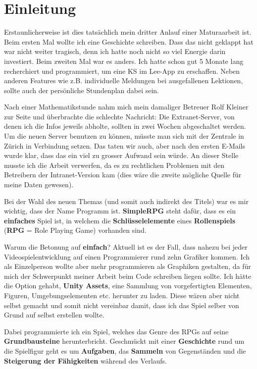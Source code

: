 \chapter{Einleitung}

Erstaunlicherweise ist dies tatsächlich mein dritter Anlauf einer Maturaarbeit ist.
Beim ersten Mal wollte ich eine Geschichte schreiben.
Dass das nicht geklappt hat war nicht weiter tragisch, denn ich hatte noch nicht so viel Energie darin investiert.
Beim zweiten Mal war es anders.
Ich hatte schon gut 5 Monate lang recherchiert und programmiert, um eine KS im Lee-App zu erschaffen.
Neben anderen Features wie z.B. individuelle Meldungen bei ausgefallenen Lektionen, sollte auch der persönliche Stundenplan dabei sein. 

\smallskip
Nach einer Mathematikstunde nahm mich mein damaliger Betreuer Rolf Kleiner zur Seite und überbrachte die schlechte Nachricht: Die Extranet-Server, von denen ich die Infos jeweils abholte, sollten in zwei Wochen abgeschaltet werden. Um die neuen Server benutzen zu können, müsste man sich mit der Zentrale in Zürich in Verbindung setzen. Das taten wir auch, aber nach den ersten E-Mails wurde klar, dass das ein viel zu grosser Aufwand sein würde. An dieser Stelle musste ich die Arbeit verwerfen, da es zu rechtlichen Problemen mit den Betreibern der Intranet-Version kam (dies wäre die zweite mögliche Quelle für meine Daten gewesen).

\smallskip
Bei der Wahl des neuen Themas (und somit auch indirekt des Titels) war es mir wichtig, dass der Name Programm ist.
\textbf{SimpleRPG} steht dafür, dass es ein \textbf{einfaches} Spiel ist, in welchem die \textbf{Schlüsselelemente} eines \textbf{Rollenspiels} (\textbf{RPG} = Role Playing Game) vorhanden sind.

\smallskip
Warum die Betonung auf \textbf{einfach}? Aktuell ist es der Fall, dass nahezu bei jeder Videospielentwicklung auf einen Programmierer rund zehn Grafiker kommen.
Ich als Einzelperson wollte aber mehr programmieren als Graphiken gestalten, da für mich der Schwerpunkt meiner Arbeit beim Code schreiben liegen sollte.
Ich hätte die Option gehabt, \textbf{Unity Assets}, eine Sammlung von vorgefertigten Elementen, Figuren, Umgebungselementen etc. herunter zu laden.
Diese wären aber nicht selbst gemacht und somit nicht vereinbar damit, dass ich das Spiel selber von Grund auf selbst erstellen wollte.

\smallskip
Dabei programmierte ich ein Spiel, welches das Genre des RPGs auf seine \textbf{Grundbausteine} herunterbricht. Geschmückt mit einer \textbf{Geschichte} rund um die Spielfigur geht es um \textbf{Aufgaben}, das \textbf{Sammeln} von Gegenständen und die \textbf{Steigerung der Fähigkeiten} während des Verlaufs. 



